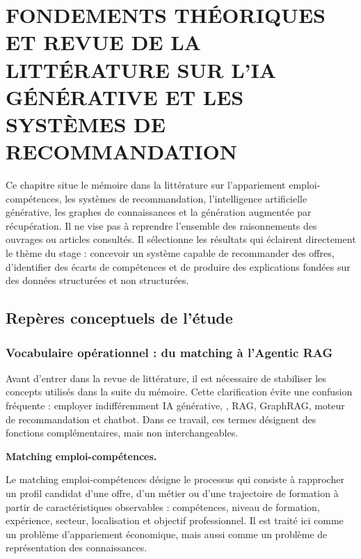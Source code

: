 \chapter{FONDEMENTS THÉORIQUES ET REVUE DE LA LITTÉRATURE SUR L'IA GÉNÉRATIVE ET LES SYSTÈMES DE RECOMMANDATION}

Ce chapitre situe le mémoire dans la littérature sur l'appariement emploi-compétences, les systèmes de recommandation, l'intelligence artificielle générative, les graphes de connaissances et la génération augmentée par récupération. Il ne vise pas à reprendre l'ensemble des raisonnements des ouvrages ou articles consultés. Il sélectionne les résultats qui éclairent directement le thème du stage : concevoir un système capable de recommander des offres, d'identifier des écarts de compétences et de produire des explications fondées sur des données structurées et non structurées.

\section{Repères conceptuels de l'étude}

\subsection{Vocabulaire opérationnel : du matching à l'Agentic RAG}

Avant d'entrer dans la revue de littérature, il est nécessaire de stabiliser les concepts utilisés dans la suite du mémoire. Cette clarification évite une confusion fréquente : employer indifféremment IA générative, \LLM{}, RAG, GraphRAG, moteur de recommandation et chatbot. Dans ce travail, ces termes désignent des fonctions complémentaires, mais non interchangeables.

\noindent\textbf{Matching emploi-compétences.}

Le matching emploi-compétences désigne le processus qui consiste à rapprocher un profil candidat d'une offre, d'un métier ou d'une trajectoire de formation à partir de caractéristiques observables : compétences, niveau de formation, expérience, secteur, localisation et objectif professionnel. Il est traité ici comme un problème d'appariement économique, mais aussi comme un problème de représentation des connaissances.

